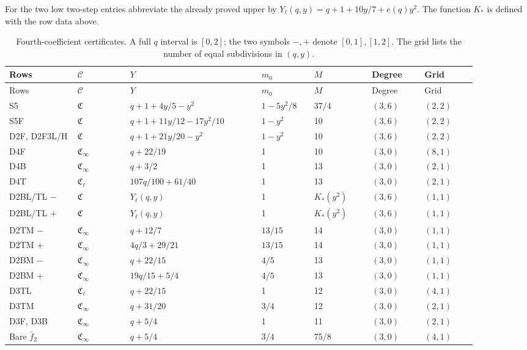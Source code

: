 For the two low two-step entries abbreviate the already proved upper
by \(Y_\ell(q,y)=q+1+10y/7+e(q)y^2\).
The function \(K_*\) is defined with the row data above.
\begingroup\small\setlength{\tabcolsep}{3pt}
\begin{longtable}{@{}p{0.13\linewidth}p{0.10\linewidth}p{0.25\linewidth}p{0.10\linewidth}p{0.11\linewidth}p{0.10\linewidth}p{0.10\linewidth}@{}}
\caption{Fourth-coefficient certificates. A full \(q\) interval is
\([0,2]\); the two symbols \(-,+\) denote \([0,1],[1,2]\).
The grid lists the number of equal subdivisions in \((q,y)\).}
\label{tab:q117-unified:curvature-data}\\
\toprule
Rows & \(\mathcal C\)& \(Y\)&\(m_0\)&\(M\)&Degree&Grid\\
\midrule\endfirsthead
\toprule
Rows & \(\mathcal C\)& \(Y\)&\(m_0\)&\(M\)&Degree&Grid\\
\midrule\endhead
S5&\(\mathfrak C\)&\(q+1+4y/5-y^2\)&\(1-5y^2/8\)&\(37/4\)&\((3,6)\)&\((2,2)\)\\
S5F&\(\mathfrak C\)&\(q+1+11y/12-17y^2/10\)&\(1-y^2\)&10&\((3,6)\)&\((2,2)\)\\
D2F, D2F3L/H&\(\mathfrak C\)&\(q+1+21y/20-y^2\)&\(1-y^2\)&10&\((3,6)\)&\((2,2)\)\\
D4F&\(\mathfrak C_\infty\)&\(q+22/19\)&1&10&\((3,0)\)&\((8,1)\)\\
D4B&\(\mathfrak C_\infty\)&\(q+3/2\)&1&13&\((3,0)\)&\((2,1)\)\\
D4T&\(\mathfrak C_\ell\)&\(107q/100+61/40\)&1&13&\((3,0)\)&\((2,1)\)\\
D2BL/TL \(-\)&\(\mathfrak C\)&\(Y_\ell(q,y)\)&1&\(K_*(y^2)\)&\((3,6)\)&\((1,1)\)\\
D2BL/TL \(+\)&\(\mathfrak C\)&\(Y_\ell(q,y)\)&1&\(K_*(y^2)\)&\((3,6)\)&\((1,1)\)\\
D2TM \(-\)&\(\mathfrak C_\infty\)&\(q+12/7\)&\(13/15\)&14&\((3,0)\)&\((1,1)\)\\
D2TM \(+\)&\(\mathfrak C_\infty\)&\(4q/3+29/21\)&\(13/15\)&14&\((3,0)\)&\((1,1)\)\\
D2BM \(-\)&\(\mathfrak C_\infty\)&\(q+22/15\)&\(4/5\)&13&\((3,0)\)&\((1,1)\)\\
D2BM \(+\)&\(\mathfrak C_\infty\)&\(19q/15+5/4\)&\(4/5\)&13&\((3,0)\)&\((1,1)\)\\
D3TL&\(\mathfrak C_\ell\)&\(q+22/15\)&1&12&\((3,0)\)&\((4,1)\)\\
D3TM&\(\mathfrak C_\infty\)&\(q+31/20\)&\(3/4\)&12&\((3,0)\)&\((2,1)\)\\
D3F, D3B&\(\mathfrak C_\infty\)&\(q+5/4\)&1&11&\((3,0)\)&\((2,1)\)\\
Bare \(\bar f_2\)&\(\mathfrak C_\infty\)&\(q+5/4\)&\(3/4\)&\(75/8\)&\((3,0)\)&\((4,1)\)\\
\bottomrule
\end{longtable}
\endgroup

